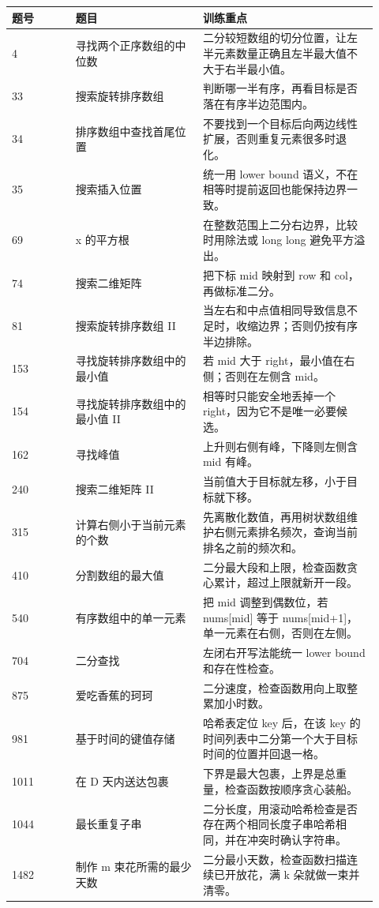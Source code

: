 \begin{longtable}{@{}p{0.16\linewidth}p{0.32\linewidth}p{0.44\linewidth}@{}}
\toprule
题号 & 题目 & 训练重点\\
\midrule
\endhead
4 & 寻找两个正序数组的中位数 & 二分较短数组的切分位置，让左半元素数量正确且左半最大值不大于右半最小值。\\
33 & 搜索旋转排序数组 & 判断哪一半有序，再看目标是否落在有序半边范围内。\\
34 & 排序数组中查找首尾位置 & 不要找到一个目标后向两边线性扩展，否则重复元素很多时退化。\\
35 & 搜索插入位置 & 统一用 lower bound 语义，不在相等时提前返回也能保持边界一致。\\
69 & x 的平方根 & 在整数范围上二分右边界，比较时用除法或 long long 避免平方溢出。\\
74 & 搜索二维矩阵 & 把下标 mid 映射到 row 和 col，再做标准二分。\\
81 & 搜索旋转排序数组 II & 当左右和中点值相同导致信息不足时，收缩边界；否则仍按有序半边排除。\\
153 & 寻找旋转排序数组中的最小值 & 若 mid 大于 right，最小值在右侧；否则在左侧含 mid。\\
154 & 寻找旋转排序数组中的最小值 II & 相等时只能安全地丢掉一个 right，因为它不是唯一必要候选。\\
162 & 寻找峰值 & 上升则右侧有峰，下降则左侧含 mid 有峰。\\
240 & 搜索二维矩阵 II & 当前值大于目标就左移，小于目标就下移。\\
315 & 计算右侧小于当前元素的个数 & 先离散化数值，再用树状数组维护右侧元素排名频次，查询当前排名之前的频次和。\\
410 & 分割数组的最大值 & 二分最大段和上限，检查函数贪心累计，超过上限就新开一段。\\
540 & 有序数组中的单一元素 & 把 mid 调整到偶数位，若 nums[mid] 等于 nums[mid+1]，单一元素在右侧，否则在左侧。\\
704 & 二分查找 & 左闭右开写法能统一 lower bound 和存在性检查。\\
875 & 爱吃香蕉的珂珂 & 二分速度，检查函数用向上取整累加小时数。\\
981 & 基于时间的键值存储 & 哈希表定位 key 后，在该 key 的时间列表中二分第一个大于目标时间的位置并回退一格。\\
1011 & 在 D 天内送达包裹 & 下界是最大包裹，上界是总重量，检查函数按顺序贪心装船。\\
1044 & 最长重复子串 & 二分长度，用滚动哈希检查是否存在两个相同长度子串哈希相同，并在冲突时确认字符串。\\
1482 & 制作 m 束花所需的最少天数 & 二分最小天数，检查函数扫描连续已开放花，满 k 朵就做一束并清零。\\
\bottomrule
\end{longtable}

